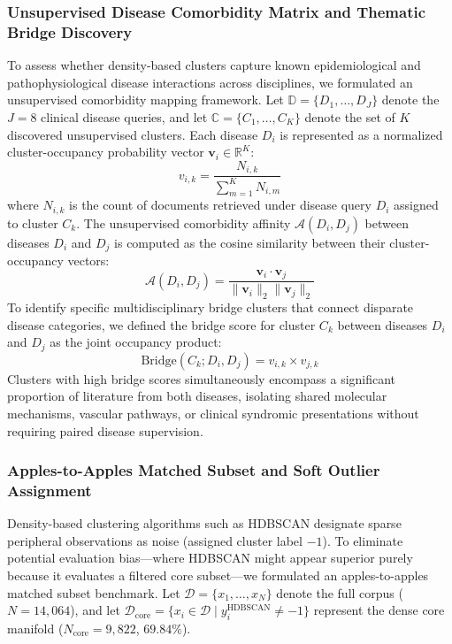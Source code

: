 \documentclass[a4paper,10pt,conference]{IEEEtran}
\begin{document}
\subsubsection{Unsupervised Disease Comorbidity Matrix and Thematic Bridge Discovery}

To assess whether density-based clusters capture known epidemiological and pathophysiological disease interactions across disciplines, we formulated an unsupervised comorbidity mapping framework. Let $\mathbb{D} = \{D_1, \dots, D_J\}$ denote the $J=8$ clinical disease queries, and let $\mathbb{C} = \{C_1, \dots, C_K\}$ denote the set of $K$ discovered unsupervised clusters. Each disease $D_i$ is represented as a normalized cluster-occupancy probability vector $\mathbf{v}_i \in \mathbb{R}^K$:
\begin{equation}
v_{i,k} = \frac{N_{i,k}}{\sum_{m=1}^K N_{i,m}}
\end{equation}
where $N_{i,k}$ is the count of documents retrieved under disease query $D_i$ assigned to cluster $C_k$. The unsupervised comorbidity affinity $\mathcal{A}(D_i, D_j)$ between diseases $D_i$ and $D_j$ is computed as the cosine similarity between their cluster-occupancy vectors:
\begin{equation}
\mathcal{A}(D_i, D_j) = \frac{\mathbf{v}_i \cdot \mathbf{v}_j}{\|\mathbf{v}_i\|_2 \|\mathbf{v}_j\|_2}
\end{equation}
To identify specific multidisciplinary bridge clusters that connect disparate disease categories, we defined the bridge score for cluster $C_k$ between diseases $D_i$ and $D_j$ as the joint occupancy product:
\begin{equation}
\text{Bridge}(C_k; D_i, D_j) = v_{i,k} \times v_{j,k}
\end{equation}
Clusters with high bridge scores simultaneously encompass a significant proportion of literature from both diseases, isolating shared molecular mechanisms, vascular pathways, or clinical syndromic presentations without requiring paired disease supervision.

\subsubsection{Apples-to-Apples Matched Subset and Soft Outlier Assignment}

Density-based clustering algorithms such as HDBSCAN designate sparse peripheral observations as noise (assigned cluster label $-1$). To eliminate potential evaluation bias—where HDBSCAN might appear superior purely because it evaluates a filtered core subset—we formulated an apples-to-apples matched subset benchmark. Let $\mathcal{D} = \{x_1, \dots, x_N\}$ denote the full corpus ($N=14{,}064$), and let $\mathcal{D}_{\text{core}} = \{x_i \in \mathcal{D} \mid y_i^{\text{HDBSCAN}} \neq -1\}$ represent the dense core manifold ($N_{\text{core}} = 9{,}822$, $69.84\%$).
\end{document}

